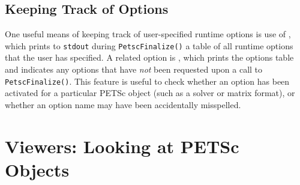 {{\subsection{Keeping Track of Options}

One useful means of keeping track of user-specified runtime options is
use of , which prints to \lstinline{stdout} during \lstinline{PetscFinalize()}
 a table of all runtime options that the user has
specified.   A related option is ,
 which prints the options table and indicates
any options that have {\em not} been requested upon a call to \lstinline{PetscFinalize()}.  This feature is useful to check whether an option
has been activated for a particular PETSc object (such as a solver or
matrix format), or whether an option name may have been accidentally
misspelled.

\section{Viewers: Looking at PETSc Objects} \label{sec_viewers}

}}
